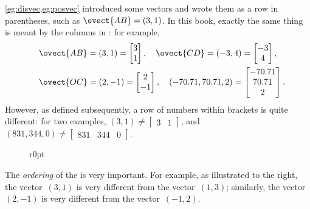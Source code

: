 \cref{eg:disvec,eg:posvec} introduced some vectors and wrote them as a row in parentheses, such as \(\ovect{AB}=(3,1)\).
In this book, exactly the same thing is meant by the columns in : for example,
\begin{eqnarray*}&&
\ovect{AB}=(3,1)=\begin{bmatrix} 3\\1 \end{bmatrix},\quad
\ovect{CD}=(-3,4)=\begin{bmatrix} -3\\4 \end{bmatrix},\quad
\\&&
\ovect{OC}=(2,-1)=\begin{bmatrix} 2\\-1 \end{bmatrix},\quad
(-70.71,70.71,2)=\begin{bmatrix} -70.71\\70.71\\2 \end{bmatrix}.
\end{eqnarray*}
However, as defined subsequently, a row of numbers within brackets is  quite different: for two examples, \((3,1)\neq\begin{bmatrix} 3&1 \end{bmatrix}\),  and \((831,344,0)\neq\begin{bmatrix} 831&344&0 \end{bmatrix}\).


\begin{figure}r{0pt}
\end{figure}
The \emph{ordering} of the  is very important.
For example, as illustrated to the right, the vector~\((3,1)\) is very different from the vector~\((1,3)\); similarly, the vector~\((2,-1)\) is very different from the vector~\((-1,2)\).
 


